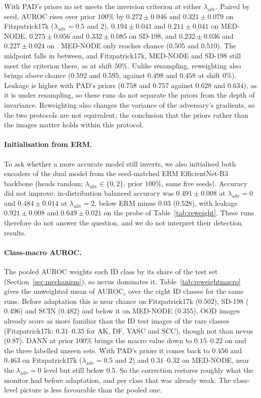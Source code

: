 \documentclass{midl}
\newcommand{\lam}{\lambda_{\mathrm{adv}}}
\begin{document}
With PAD's priors no set meets the inversion criterion at either $\lam$. Paired by seed, AUROC rises
over prior $100\%$ by $0.272\pm0.046$ and $0.321\pm0.079$ on Fitzpatrick17k ($\lam=0.5$ and $2$),
$0.194\pm0.041$ and $0.211\pm0.041$ on MED-NODE, $0.275\pm0.056$ and $0.332\pm0.085$ on SD-198, and
$0.232\pm0.036$ and $0.227\pm0.024$ on \texttt{}. MED-NODE only reaches chance
($0.505$ and $0.510$). The midpoint falls in between, and Fitzpatrick17k, MED-NODE and SD-198 still meet
the criterion there, as at shift $50\%$. Unlike resampling, reweighting also brings
\texttt{} above chance ($0.592$ and $0.595$, against $0.498$ and $0.458$ at
shift $0\%$). Leakage is higher with PAD's priors ($0.758$ and $0.757$ against $0.628$ and $0.634$), as
it is under resampling, so these runs do not separate the priors from the depth of invariance.
Reweighting also changes the variance of the adversary's gradients, so the two protocols are not
equivalent; the conclusion that the priors rather than the images matter holds within this protocol.

\paragraph{Initialisation from ERM.} To ask whether a more accurate model still inverts, we also
initialised both encoders of the dual model from the seed-matched ERM EfficientNet-B3 backbone (heads
random; $\lam\in\{0,2\}$, prior $100\%$, same five seeds). Accuracy did not improve: in-distribution
balanced accuracy was $0.491\pm0.008$ at $\lam=0$ and $0.484\pm0.014$ at $\lam=2$, below ERM minus $0.03$
($0.528$), with leakage $0.921\pm0.008$ and $0.649\pm0.021$ on the probe of Table~\ref{tab:reweight}.
These runs therefore do not answer the question, and we do not interpret their detection results.

\paragraph{Class-macro AUROC.} The pooled AUROC weights each ID class by its share of the test set
(Section~\ref{sec:mechanism}), so nevus dominates it. Table~\ref{tab:reweightmacro} gives the unweighted
mean of $\mathrm{AUROC}_c$ over the eight ID classes for the same runs. Before adaptation this is near
chance on Fitzpatrick17k ($0.502$), SD-198 ($0.496$) and SCIN ($0.482$) and below it on MED-NODE
($0.355$). OOD images already score as more familiar than the ID test images of the rare classes
(Fitzpatrick17k: $0.31$--$0.35$ for AK, DF, VASC and SCC), though not than nevus ($0.87$). DANN at prior
$100\%$ brings the macro value down to $0.15$--$0.22$ on \texttt{} and the
three labelled unseen sets. With PAD's priors it comes back to $0.456$ and $0.463$ on Fitzpatrick17k
($\lam=0.5$ and $2$) and $0.31$--$0.32$ on MED-NODE, near the $\lam=0$ level but still below $0.5$.
So the correction restores roughly what the monitor had before adaptation, and per class that was
already weak. The class-level picture is less favourable than the pooled one.
\end{document}

